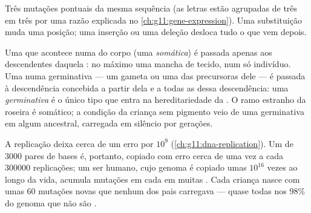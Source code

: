 \begin{omfigure}

{\small Três mutações pontuais da mesma sequência (as letras estão
agrupadas de três em três por uma razão explicada no
\cref{ch:g11:gene-expression}). Uma substituição muda uma posição; uma
inserção ou uma deleção desloca tudo o que vem depois.}
\end{omfigure}

\begin{proposition}\label{prop:g11:mutations:where}
Uma  que acontece numa  do corpo (uma
\emph{ somática}) é passada apenas aos descendentes daquela
: no máximo uma mancha de tecido, num só indivíduo. Uma 
numa  germinativa --- um gameta ou uma das precursoras dele --- é
passada à descendência concebida a partir dela e a todas as 
dessa descendência: uma \emph{ germinativa} é o único tipo que
entra na hereditariedade da . O ramo estranho da roseira é
somático; a condição da criança sem pigmento veio de uma 
germinativa em algum ancestral, carregada em silêncio por gerações.
\end{proposition}
\admitted

\begin{example}\label{ex:g11:mutations:frequency}
A replicação deixa cerca de um erro por $10^9$ 
(\cref{ch:g11:dna-replication}). Um  de $\num{3000}$ pares de bases
é, portanto, copiado com erro cerca de uma vez a cada
$\num{300000}$ replicações; um ser humano, cujo genoma é copiado umas
$10^{16}$ vezes ao longo da vida, acumula mutações em cada  em
muitas . Cada criança nasce com umas 60 mutações novas que
nenhum dos pais carregava --- quase todas nos 98\% do genoma que não
são .
\end{example}

